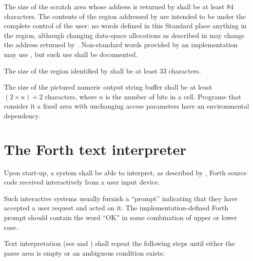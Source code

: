 The size of the scratch area whose address is returned by 
shall be at least 84 characters. The contents of the region
addressed by  are intended to be under the complete
control of the user: no words defined in this Standard place
anything in the region, although changing data-space allocations as
described in  may change
the address returned by . Non-standard words provided by
an implementation may use , but such use shall be
documented.

The size of the region identified by  shall be at least
33 characters.

The size of the pictured numeric output string buffer shall be at
least $(2 \times n) + 2 $ characters, where $n$ is the number of
bits in a cell. Programs that consider it a fixed area with
unchanging access parameters have an environmental dependency.

\section{The Forth text interpreter} %
\label{usage:command}

Upon start-up, a system shall be able to interpret, as described
by , Forth source code received interactively
from a user input device.

Such interactive systems usually furnish a ``prompt'' indicating
that they have accepted a user request and acted on it. The
implementation-defined Forth prompt should contain the word ``OK''
in some combination of upper or lower case.

Text interpretation (see  and
) shall repeat the following steps until
either the parse area is empty or an ambiguous condition exists:

